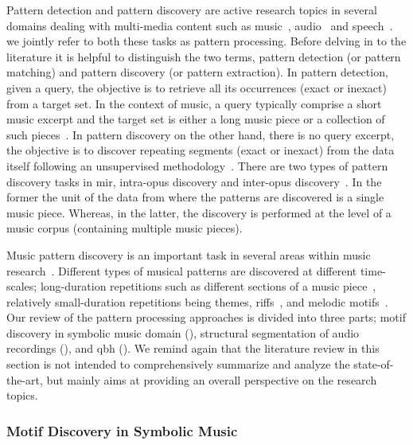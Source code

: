 Pattern detection and pattern discovery are active research topics in several domains dealing with multi-media content such as music~\citep{klapuri2010pattern}, audio~\citep{Herley2006} and speech~\citep{Park2008}. we jointly refer to both these tasks as pattern processing. Before delving in to the literature it is helpful to distinguish the two terms, pattern detection (or pattern matching) and pattern discovery (or pattern extraction). In pattern detection, given a query, the objective is to retrieve all its occurrences (exact or inexact) from a target set. In the context of music, a query typically comprise a short music excerpt and the target set is either a long music piece or a collection of such pieces~\citep{ghias1995query}. In pattern discovery on the other hand, there is no query excerpt, the objective is to discover repeating segments (exact or inexact) from the data itself following an unsupervised methodology~\citep{dannenberg2003pattern}. There are two types of pattern discovery tasks in \gls{mir}, intra-opus discovery and inter-opus discovery~\citep{conklin2001representation}. In the former the unit of the data from where the patterns are discovered is a single music piece. Whereas, in the latter, the discovery is performed at the level of a music corpus (containing multiple music pieces).

Music pattern discovery is an important task in several areas within music research~\cite{collins2011modeling,Conklin2010a,Serra2014,nieto2012compressing}. Different types of musical patterns are discovered at different time-scales; long-duration repetitions such as different sections of a music piece~\citep{serra2012unsupervised,Goto06TASLP}, relatively small-duration repetitions being themes, riffs~\citep{Hsu2001a}, and melodic motifs~\citep{collins2011improved}. Our review of the pattern processing approaches is divided into three parts; motif discovery in symbolic music domain (), structural segmentation of audio recordings (), and \gls{qbh} (). We remind again that the literature review in this section is not intended to comprehensively summarize and analyze the state-of-the-art, but mainly aims at providing an overall perspective on the research topics.


\subsubsection{Motif Discovery in Symbolic Music}
\label{sec:motif_in_symbolic_music}

